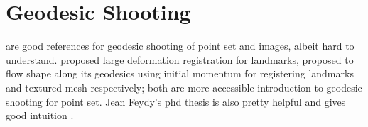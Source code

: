 \documentclass[11pt]{article}
\begin{document}
\section{Geodesic Shooting}

\cite{millerGeodesicShootingComputational2006,vialardDiffeomorphic3DImage2012} are good references for geodesic shooting of point set and images, albeit hard to understand. \cite{joshiLandmarkMatchingLarge2000} proposed large deformation registration for landmarks, \cite{vaillantStatisticsDiffeomorphismsTangent2004,allassonniereGeodesicShootingDiffeomorphic2005} proposed to flow shape along its geodesics using initial momentum for registering landmarks and textured mesh respectively; both are more accessible introduction to geodesic shooting for point set. Jean Feydy's phd thesis is also pretty helpful and gives good intuition \cite{feydyGeometricDataAnalysis2020}.
\end{document}
